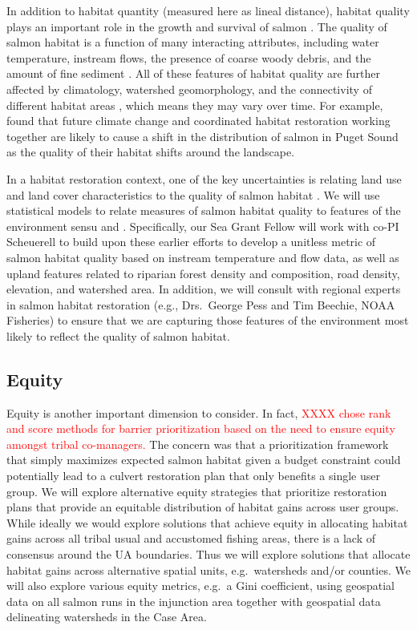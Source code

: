 In addition to habitat quantity (measured here as lineal distance), habitat quality plays an important role in the growth and survival of salmon \citep{Pess_2011}. The quality of salmon habitat is a function of many interacting attributes, including water temperature, instream flows, the presence of coarse woody debris, and the amount of fine sediment \citep{Bartz_2006,Isaak_2007}. All of these features of habitat quality are further affected by climatology, watershed geomorphology, and the connectivity of different habitat areas \citep{Caissie_2006, Rodeles_2019}, which means they may vary over time. For example, \citet{Battin_2007} found that future climate change and coordinated habitat restoration working together are likely to cause a shift in the distribution of salmon in Puget Sound as the quality of their habitat shifts around the landscape.

In a habitat restoration context, one of the key uncertainties is relating land use and land cover characteristics to the quality of salmon habitat \citep{Bartz_2006, Jorgensen_2009}. We will use statistical models to relate measures of salmon habitat quality to features of the environment sensu \citet{Bartz_2006} and \citet{Jorgensen_2009}. Specifically, our Sea Grant Fellow will work with co-PI Scheuerell to build upon these earlier efforts to develop a unitless metric of salmon habitat quality based on instream temperature and flow data, as well as upland features related to riparian forest density and composition, road density, elevation, and watershed area. In addition, we will consult with regional experts in salmon habitat restoration (e.g., Drs.\ George Pess and Tim Beechie, NOAA Fisheries) to ensure that we are capturing those features of the environment most likely to reflect the quality of salmon habitat.

\subsection*{Equity}

Equity is another important dimension to consider. In fact, \textcolor{red}{XXXX chose rank and score methods for barrier prioritization based on the need to ensure equity amongst tribal co-managers.} The concern was that a prioritization framework that simply maximizes expected salmon habitat given a budget constraint could potentially lead to a culvert restoration plan that only benefits a single user group. We will explore alternative equity strategies that prioritize restoration plans that provide an equitable distribution of habitat gains across user groups. While ideally we would explore solutions that achieve equity in allocating habitat gains across all tribal usual and accustomed fishing areas, there is a lack of consensus around the UA boundaries. Thus we will explore solutions that allocate habitat gains across alternative spatial units, e.g.\ watersheds and/or counties. We will also explore various equity metrics, e.g.\ a Gini coefficient, using geospatial data on all salmon runs in the injunction area together with geospatial data delineating watersheds in the Case Area. 

